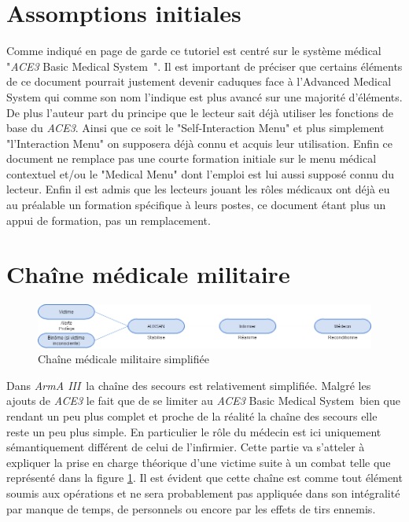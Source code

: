 \documentclass{article}
\newcommand{\arma}{\emph{ArmA III}}
\newcommand{\medsys}{\emph{ACE3} Basic Medical System}
\begin{document}
	\part{Assomptions initiales}
		Comme indiqué en page de garde ce tutoriel est centré sur le système médical "\medsys\ ". Il est important de préciser que certains éléments de ce document pourrait justement devenir caduques face à l'Advanced Medical System qui comme son nom l'indique est plus avancé sur une majorité d'éléments. De plus l'auteur part du principe que le lecteur sait déjà utiliser les fonctions de base du \emph{ACE3}. Ainsi que ce soit le "Self-Interaction Menu" et plus simplement "l'Interaction Menu" on supposera déjà connu et acquis leur utilisation. Enfin ce document ne remplace pas une courte formation initiale sur le menu médical contextuel et/ou le "Medical Menu" dont l'emploi est lui aussi supposé connu du lecteur. Enfin il est admis que les lecteurs jouant les rôles médicaux ont déjà eu au préalable un formation spécifique à leurs postes, ce document étant plus un appui de formation, pas un remplacement.
	
	\part{Chaîne médicale militaire}
		\begin{figure}[h]
			\centerline{\includegraphics[scale=0.6]{FlowchartSecoursMilitaire}}
			\caption{\label{FlowchartSecoursMilitaire} Chaîne médicale militaire simplifiée}
		\end{figure}
		Dans \arma\ la chaîne des secours est relativement simplifiée. Malgré les ajouts de \emph{ACE3} le fait que de se limiter au \medsys\ bien que rendant un peu plus complet et proche de la réalité la chaîne des secours elle reste un peu plus simple. En particulier le rôle du médecin est ici uniquement sémantiquement différent de celui de l'infirmier. Cette partie va s'atteler à expliquer la prise en charge théorique d'une victime suite à un combat telle que représenté dans la figure \ref{FlowchartSecoursMilitaire}. Il est évident que cette chaîne est comme tout élément soumis aux opérations et ne sera probablement pas appliquée dans son intégralité par manque de temps, de personnels ou encore par les effets de tirs ennemis.\\
		
\end{document}
